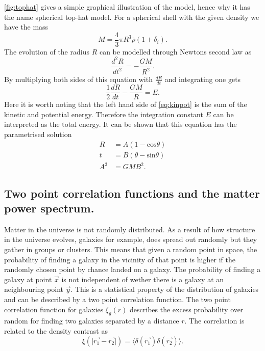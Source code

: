 \ref{fig:tophat} gives a simple graphical illustration of the model, hence why
it has the name spherical top-hat model. For a spherical shell with the given
density we have the mass
\begin{equation}
    M=\frac{4}{3}\pi R^3\bar{\rho}(1+\delta_i).
\end{equation}
The evolution of the radius $R$ can be modelled through Newtons second law as
\begin{equation}
    \frac{d^2R}{dt^2}=-\frac{GM}{R^2}.
\end{equation}
By multiplying both sides of this equation with $\frac{dR}{dt}$ and integrating
one gets
\begin{equation}\label{eq:kinpot}
    \frac{1}{2}\frac{dR}{dt}-\frac{GM}{R}=E.
\end{equation}
Here it is worth noting that the left hand side of \ref{eq:kinpot} is the sum of
the kinetic and potential energy. Therefore the integration constant $E$ can be
interpreted as the total energy. It can be shown that this equation has the
parametrised solution
\begin{align}
    R&=A(1-\mathrm{cos}\theta)\\
    t&=B(\theta-\mathrm{sin}\theta)\\
    A^3&=GMB^2.
\end{align}

\subsection{Two point correlation functions and the matter power spectrum.}
Matter in the universe is not randomly distributed. As a result of how structure in the universe evolves, galaxies for example,
does spread out randomly but they gather in groups or clusters. This means that given a random point in space, the probability of finding
a galaxy in the vicinity of that point is higher if the randomly chosen point by chance landed on a galaxy. The probability of finding a galaxy
at point $\vec{x}$ is not independent of wether there is a galaxy at an neighbouring point $\vec{y}$. This is a statistical property of the distribution
of galaxies and can be described by a two point correlation function. The two point correlation function for galaxies $\xi_{g}(r)$ describes the excess probability
over random for finding two galaxies separated by a distance $r$. The correlation is related to the density contrast as
\begin{equation}
    \xi(\vert\vec{r_1}-\vec{r_2}\vert)=\langle\delta(\vec{r_1})\delta(\vec{r_2})\rangle.
\end{equation}

